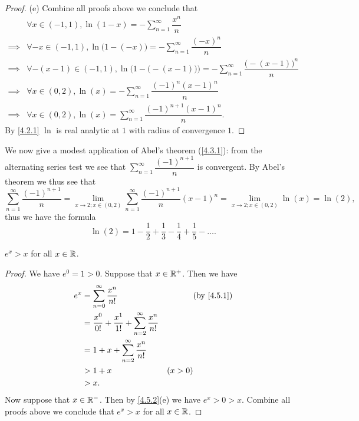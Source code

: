 \begin{proof}{(e)}
  Combine all proofs above we conclude that
  \begin{align*}
             & \forall x \in (-1, 1), \ln(1 - x) = - \sum_{n = 1}^\infty \dfrac{x^n}{n}                                                  \\
    \implies & \forall -x \in (-1, 1), \ln\big(1 - (-x)\big) = - \sum_{n = 1}^\infty \dfrac{(-x)^n}{n}                                   \\
    \implies & \forall -(x - 1) \in (-1, 1), \ln\Big(1 - \big(-(x - 1)\big)\Big) = - \sum_{n = 1}^\infty \dfrac{\big(-(x - 1)\big)^n}{n} \\
    \implies & \forall x \in (0, 2), \ln(x) = - \sum_{n = 1}^\infty \dfrac{(-1)^n (x - 1)^n}{n}                                          \\
    \implies & \forall x \in (0, 2), \ln(x) = \sum_{n = 1}^\infty \dfrac{(-1)^{n + 1} (x - 1)^n}{n}.
  \end{align*}
  By \cref{4.2.1} \(\ln\) is real analytic at \(1\) with radius of convergence \(1\).
\end{proof}

\begin{eg}\label{4.5.7}
  We now give a modest application of Abel's theorem (\cref{4.3.1}):
  from the alternating series test we see that \(\sum_{n = 1}^\infty \dfrac{(-1)^{n + 1}}{n}\) is convergent.
  By Abel's theorem we thus see that
  \[
    \sum_{n = 1}^\infty \dfrac{(-1)^{n + 1}}{n} = \lim_{x \to 2 ; x \in (0, 2)} \sum_{n = 1}^\infty \dfrac{(-1)^{n + 1}}{n} (x - 1)^n = \lim_{x \to 2 ; x \in (0, 2)} \ln(x) = \ln(2),
  \]
  thus we have the formula
  \[
    \ln(2) = 1 - \dfrac{1}{2} + \dfrac{1}{3} - \dfrac{1}{4} +\dfrac{1}{5} - \dots.
  \]
\end{eg}

\begin{ac}\label{ac:4.5.1}
  \(e^x > x\) for all \(x \in \mathbb{R}\).
\end{ac}

\begin{proof}
  We have \(e^0 = 1 > 0\).
  Suppose that \(x \in \mathbb{R}^+\).
  Then we have
  \begin{align*}
    e^x & = \sum_{n = 0}^\infty \dfrac{x^n}{n!}                                     &         & \by{4.5.1} \\
        & = \dfrac{x^0}{0!} + \dfrac{x^1}{1!} + \sum_{n = 2}^\infty \dfrac{x^n}{n!}                        \\
        & = 1 + x + \sum_{n = 2}^\infty \dfrac{x^n}{n!}                                                    \\
        & > 1 + x                                                                   & (x > 0)              \\
        & > x.
  \end{align*}
  Now suppose that \(x \in \mathbb{R}^-\).
  Then by \cref{4.5.2}(e) we have \(e^x > 0 > x\).
  Combine all proofs above we conclude that \(e^x > x\) for all \(x \in \mathbb{R}\).
\end{proof}

